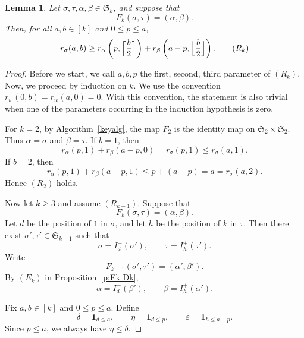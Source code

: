 \documentclass[12pt]{amsart}
\DeclarePairedDelimiter\ceil{\lceil}{\rceil}
\DeclarePairedDelimiter\floor{\lfloor}{\rfloor}
\newtheorem{lem}[thm]{Lemma}
\theoremstyle{definition}
\numberwithin{equation}{section}
\begin{document}
\begin{lem}\label{l:Rk}
Let $\sigma,\tau,\alpha,\beta\in\mathfrak S_k$, and suppose that
\begin{equation*}
F_k(\sigma,\tau)=(\alpha,\beta).
\end{equation*}
Then, for all $a,b\in[k]$ and $0\leq p\leq a$,
\begin{equation}
r_\sigma(a,b)
\geq
r_\alpha\left(
p,
\ceil[\Big]{\frac{b}{2}}
\right)
+
r_\beta\left(
a-p,
\floor[\Big]{\frac{b}{2}}
\right).
\tag{$R_k$}
\end{equation}
\end{lem}

\begin{proof}
Before we start, we call $a,b,p$ the first, second, third parameter of $(R_k)$. Now, we proceed by induction on $k$. We use the convention
$r_w(0,b)=r_w(a,0)=0$. With this convention, the statement is also
trivial when one of the parameters occurring in the induction
hypothesis is zero.

For $k=2$, by Algorithm~\ref{keyalg}, the map $F_2$ is the identity map on
$\mathfrak S_2\times\mathfrak S_2$. Thus $\alpha=\sigma$ and
$\beta=\tau$. If $b=1$, then
\begin{equation*}
r_\alpha(p,1)+r_\beta(a-p,0)
=
r_\sigma(p,1)
\leq
r_\sigma(a,1).
\end{equation*}
If $b=2$, then
\begin{equation*}
r_\alpha(p,1)+r_\beta(a-p,1)
\leq
p+(a-p)
=
a
=
r_\sigma(a,2).
\end{equation*}
Hence $(R_2)$ holds.

Now let $k\geq 3$ and assume $(R_{k-1})$. Suppose that
\begin{equation*}
F_k(\sigma,\tau)=(\alpha,\beta).
\end{equation*}
Let $d$ be the position of $1$ in $\sigma$, and let $h$ be the position
of $k$ in $\tau$. Then there exist
$\sigma',\tau'\in\mathfrak S_{k-1}$ such that
\begin{equation*}
\sigma=I_d^-(\sigma'),
\qquad
\tau=I_h^+(\tau').
\end{equation*}
Write
\begin{equation*}
F_{k-1}(\sigma',\tau')=(\alpha',\beta').
\end{equation*}
By $(E_k)$ in Proposition~\ref{p:Ek Dk},
\begin{equation*}
\alpha=I_d^-(\beta'),
\qquad
\beta=I_h^+(\alpha').
\end{equation*}

Fix $a,b\in[k]$ and $0\leq p\leq a$. Define
\begin{equation*}
\delta=\mathbf{1}_{d\leq a},
\qquad
\eta=\mathbf{1}_{d\leq p},
\qquad
\varepsilon=\mathbf{1}_{h\leq a-p}.
\end{equation*}
Since $p\leq a$, we always have $\eta\leq\delta$.


\end{proof}
\end{document}
